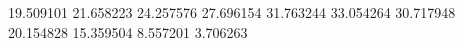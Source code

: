 19.509101
21.658223
24.257576
27.696154
31.763244
33.054264
30.717948
20.154828
15.359504
8.557201
3.706263
